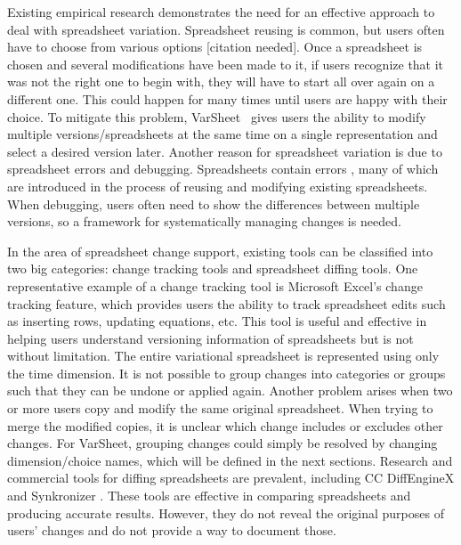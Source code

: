 \documentclass[conference]{IEEEtran}
\newcommand{\varsheet}{VarSheet}
\begin{document}
Existing empirical research demonstrates the need for an effective approach to deal with spreadsheet variation.
Spreadsheet reusing is common, but users often have to choose from various options [citation needed].
Once a spreadsheet is chosen and several modifications have been made to it,
if users recognize that it was not the right one to begin with, they will have to start all over again on a
different one. This could happen for many times until users are happy with their choice. To mitigate this problem, \varsheet~
gives users the ability to modify multiple versions/spreadsheets at the same time on a single representation and
select a desired version later.
Another reason for spreadsheet variation is due to spreadsheet errors and debugging.
Spreadsheets contain errors \cite{Panko98whatwe}\cite{Powell2008128}, many of which are introduced in the process of
reusing and modifying existing spreadsheets. When debugging, users often need to show the
differences between multiple versions, so a framework for systematically managing changes is needed.

In the area of spreadsheet change support, existing tools can be classified into two big categories: change tracking tools and spreadsheet diffing tools.
One representative example of a change tracking tool is Microsoft Excel's change tracking feature, which provides users the ability to track spreadsheet edits
such as inserting rows, updating equations, etc. This tool is useful and effective in helping users
understand versioning information of spreadsheets but is not
without limitation. The entire variational spreadsheet is represented using only the time dimension. It is not possible
to group changes into categories or groups such that they can be undone or applied again. Another problem arises when two or more users copy and modify
the same original spreadsheet. When trying to merge the modified copies, it is unclear which change includes or excludes other changes.
For \varsheet, grouping changes could simply be resolved by changing dimension/choice names, which will be defined in the next sections.
Research and commercial tools for diffing spreadsheets are prevalent, including CC DiffEngineX \cite{DiffEngineX} and Synkronizer \cite{Synkronizer}.
These tools are effective in comparing spreadsheets and producing accurate results. However, they do not reveal the original purposes
of users' changes and do not provide a way to document those.
\end{document}
